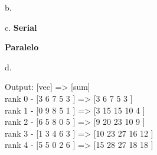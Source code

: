 b.


c. \textbf{Serial}

\textbf{Paralelo}


d. 

Output:  [vec] => [sum] \\
rank 0 - [3 6 7 5 3 ] => [3 6 7 5 3 ] \\
rank 1 - [0 9 8 5 1 ] => [3 15 15 10 4 ] \\
rank 2 - [6 5 8 0 5 ] => [9 20 23 10 9 ] \\
rank 3 - [1 3 4 6 3 ] => [10 23 27 16 12 ] \\
rank 4 - [5 5 0 2 6 ] => [15 28 27 18 18 ] \\

